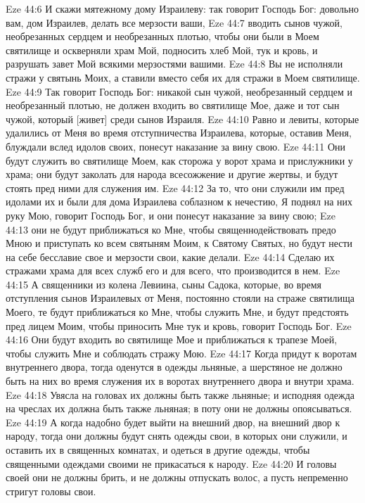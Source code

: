 Eze 44:6  И скажи мятежному дому Израилеву: так говорит Господь Бог: довольно вам, дом Израилев, делать все мерзости ваши,
Eze 44:7  вводить сынов чужой, необрезанных сердцем и необрезанных плотью, чтобы они были в Моем святилище и оскверняли храм Мой, подносить хлеб Мой, тук и кровь, и разрушать завет Мой всякими мерзостями вашими.
Eze 44:8  Вы не исполняли стражи у святынь Моих, а ставили вместо себя их для стражи в Моем святилище.
Eze 44:9  Так говорит Господь Бог: никакой сын чужой, необрезанный сердцем и необрезанный плотью, не должен входить во святилище Мое, даже и тот сын чужой, который [живет] среди сынов Израиля.
Eze 44:10  Равно и левиты, которые удалились от Меня во время отступничества Израилева, которые, оставив Меня, блуждали вслед идолов своих, понесут наказание за вину свою.
Eze 44:11  Они будут служить во святилище Моем, как сторожа у ворот храма и прислужники у храма; они будут заколать для народа всесожжение и другие жертвы, и будут стоять пред ними для служения им.
Eze 44:12  За то, что они служили им пред идолами их и были для дома Израилева соблазном к нечестию, Я поднял на них руку Мою, говорит Господь Бог, и они понесут наказание за вину свою;
Eze 44:13  они не будут приближаться ко Мне, чтобы священнодействовать предо Мною и приступать ко всем святыням Моим, к Святому Святых, но будут нести на себе бесславие свое и мерзости свои, какие делали.
Eze 44:14  Сделаю их стражами храма для всех служб его и для всего, что производится в нем.
Eze 44:15  А священники из колена Левиина, сыны Садока, которые, во время отступления сынов Израилевых от Меня, постоянно стояли на страже святилища Моего, те будут приближаться ко Мне, чтобы служить Мне, и будут предстоять пред лицем Моим, чтобы приносить Мне тук и кровь, говорит Господь Бог.
Eze 44:16  Они будут входить во святилище Мое и приближаться к трапезе Моей, чтобы служить Мне и соблюдать стражу Мою.
Eze 44:17  Когда придут к воротам внутреннего двора, тогда оденутся в одежды льняные, а шерстяное не должно быть на них во время служения их в воротах внутреннего двора и внутри храма.
Eze 44:18  Увясла на головах их должны быть также льняные; и исподняя одежда на чреслах их должна быть также льняная; в поту они не должны опоясываться.
Eze 44:19  А когда надобно будет выйти на внешний двор, на внешний двор к народу, тогда они должны будут снять одежды свои, в которых они служили, и оставить их в священных комнатах, и одеться в другие одежды, чтобы священными одеждами своими не прикасаться к народу.
Eze 44:20  И головы своей они не должны брить, и не должны отпускать волос, а пусть непременно стригут головы свои.
